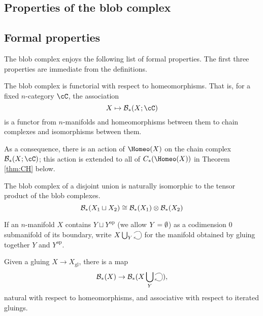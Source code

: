 \documentclass{pnastwo}
\begin{document}
\begin{article}
\section{Properties of the blob complex}
\subsection{Formal properties}
\label{sec:properties}
The blob complex enjoys the following list of formal properties. The first three properties are immediate from the definitions.

\begin{property}[Functoriality]
\label{property:functoriality}%
The blob complex is functorial with respect to homeomorphisms.
That is, 
for a fixed $n$-category $\cC$, the association
\begin{equation*}
X \mapsto \bc_*(X; \cC)
\end{equation*}
is a functor from $n$-manifolds and homeomorphisms between them to chain 
complexes and isomorphisms between them.
\end{property}
As a consequence, there is an action of $\Homeo(X)$ on the chain complex $\bc_*(X; \cC)$; 
this action is extended to all of $C_*(\Homeo(X))$ in Theorem \ref{thm:CH} below.

\begin{property}
\label{property:disjoint-union}
The blob complex of a disjoint union is naturally isomorphic to the tensor product of the blob complexes.
\begin{equation*}
{\mathcal B}_*(X_1 \sqcup X_2) \cong {\mathcal B}_*(X_1) \otimes {\mathcal B}_*(X_2)
\end{equation*}
\end{property}

If an $n$-manifold $X$ contains $Y \sqcup Y^\text{op}$ (we allow $Y = \emptyset$) as a codimension $0$ submanifold of its boundary, 
write $X \bigcup_{Y}\selfarrow$ for the manifold obtained by gluing together $Y$ and $Y^\text{op}$.
\begin{property}
\label{property:gluing-map}%
Given a gluing $X \to X_\mathrm{gl}$, there is
a map
\[
	\bc_*(X) \to \bc_*(X \bigcup_{Y}\selfarrow),
\]
natural with respect to homeomorphisms, and associative with respect to iterated gluings.
\end{property}


\end{article}
\end{document}
